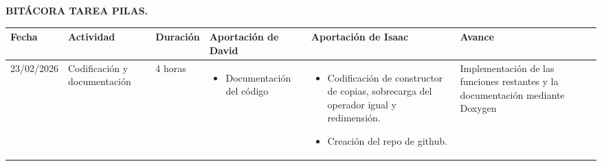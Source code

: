 \documentclass[11pt]{article}
\begin{document}
\begin{center}
    \Large \textbf{BITÁCORA TAREA PILAS.}
\end{center}
\vspace{0.3cm}

\renewcommand{\arraystretch}{1.6} 
\noindent
\begin{tabularx}{\textwidth}{|l|p{2.5cm}|l|X|X|X|}
\hline
\textbf{Fecha} & \textbf{Actividad} & \textbf{Duración} & \textbf{Aportación de David} & \textbf{Aportación de Isaac} & \textbf{Avance} \\
\hline
23/02/2026 & Codificación y documentación & 4 horas & 
\begin{itemize}[leftmargin=*, topsep=0pt, itemsep=0.2cm]
    \item Documentación del código
\end{itemize} & 
\begin{itemize}[leftmargin=*, topsep=0pt]
    \item Codificación de constructor de copias, sobrecarga del operador igual y redimensión.
     \item Creación del repo de github.
\end{itemize} & 
Implementación de las funciones restantes y la documentación mediante Doxygen \\
\hline
\end{tabularx}
\end{document}
